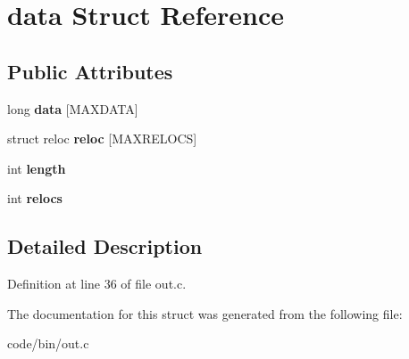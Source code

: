 \section{data Struct Reference}
\label{structdata}
\subsection*{Public Attributes}
\begin{DoxyCompactItemize}
\item 
long {\bfseries data} [M\+A\+X\+D\+A\+TA]\label{structdata_ac96c6a0d863da21a72539ed46f1bf2d1}

\item 
struct reloc {\bfseries reloc} [M\+A\+X\+R\+E\+L\+O\+CS]\label{structdata_ab8d8f9e85a8b063ef72a7bb93a2273c1}

\item 
int {\bfseries length}\label{structdata_ab1464d70ed28af0a16cdd2ebaa64027c}

\item 
int {\bfseries relocs}\label{structdata_aa05a3dbeef100101ca69bb4e49f37b32}

\end{DoxyCompactItemize}


\subsection{Detailed Description}


Definition at line 36 of file out.\+c.



The documentation for this struct was generated from the following file\+:\begin{DoxyCompactItemize}
\item 
code/bin/out.\+c\end{DoxyCompactItemize}
